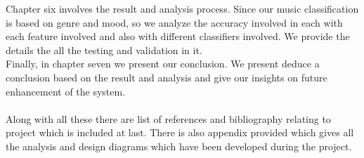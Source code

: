 Chapter six involves the result and analysis process. Since our music classification is based on genre and mood, so we analyze the accuracy involved in each with each feature involved and also with 
different classifiers involved. We provide the details the all the testing and validation in it. 
\\
Finally, in chapter seven we present our conclusion. We present deduce a conclusion based on the result and analysis and give our insights on future enhancement of the system.\\
\\
Along with all these there are list of references and bibliography relating to project which is included at last. There is also appendix provided which gives all the analysis
and design diagrams which have been developed during the project.\\

